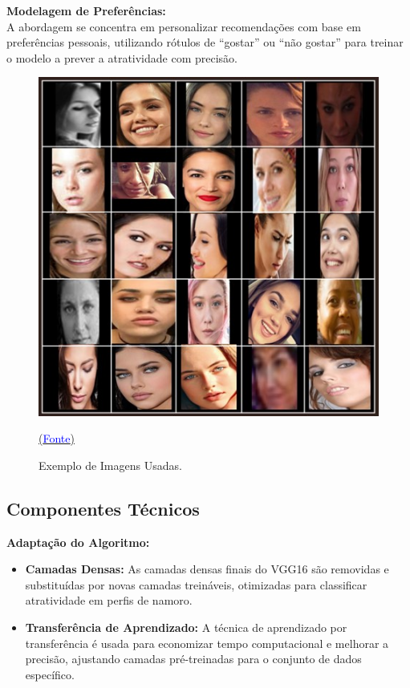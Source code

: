 \textbf{Modelagem de Preferências:} \\
A abordagem se concentra em personalizar recomendações com base em preferências pessoais, utilizando rótulos de ``gostar'' ou ``não gostar'' para treinar o modelo a prever a atratividade com precisão.
\clearpage
\begin{figure}
    \centering
    \includegraphics[width=0.8\linewidth]{faces.png}
    \caption{Exemplo de Imagens Usadas.} \protect\href{https://github.com/DesiPilla/cafe}{(\textcolor{blue}{Fonte})}
    \label{fig:cnn}
\end{figure}



\subsection{Componentes Técnicos}

\textbf{Adaptação do Algoritmo:}

\begin{itemize}
    \item \textbf{Camadas Densas:} As camadas densas finais do VGG16 são removidas e substituídas por novas camadas treináveis, otimizadas para classificar atratividade em perfis de namoro.
    \item \textbf{Transferência de Aprendizado:} A técnica de aprendizado por transferência é usada para economizar tempo computacional e melhorar a precisão, ajustando camadas pré-treinadas para o conjunto de dados específico.
\end{itemize}

